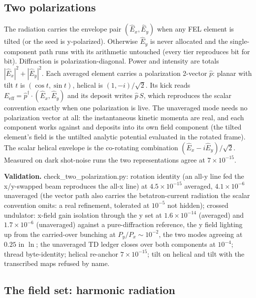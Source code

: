 \documentclass[11pt]{article}
\newenvironment{validation}{\par\small\textbf{Validation.}}{\par}
\begin{document}
\subsection{Two polarizations}\label{sec:vector}

The radiation carries the envelope pair $(\hat E_x, \hat E_y)$ when any FEL element
is tilted (or the seed is y-polarized). Otherwise $\hat E_y$ is never allocated and
the single-component path runs with its arithmetic untouched (every tier reproduces
bit for bit). Diffraction is polarization-diagonal. Power and intensity are totals
$|\hat E_x|^2 + |\hat E_y|^2$. Each averaged element carries a polarization 2-vector
$\hat p$: planar with tilt $t$ is $(\cos t, \sin t)$, helical is $(1, -i)/\sqrt2$.
Its kick reads $E_{\mathrm{eff}} = \hat p^\dagger\!\cdot\!(\hat E_x,\hat E_y)$
and its deposit writes $\hat p\,S$, which reproduces the scalar convention exactly
when one polarization is live. The unaveraged mode needs no polarization vector at
all: the instantaneous kinetic momenta are real, and each component works against and
deposits into its own field component (the tilted element's field is the untilted
analytic potential evaluated in the rotated frame). The scalar helical envelope is
the co-rotating combination $(\hat E_x - i\hat E_y)/\sqrt2$. Measured on dark
shot-noise runs the two representations agree at $7\times10^{-15}$.

\begin{validation}
check\_two\_polarization.py: rotation identity (an all-y line fed the x/y-swapped
beam reproduces the all-x line) at $4.5\times10^{-15}$ averaged, $4.1\times10^{-6}$
unaveraged (the vector path also carries the betatron-current radiation the scalar
convention omits: a real refinement, tolerated at $10^{-5}$ not hidden); crossed
undulator: x-field gain isolation through the y set at $1.6\times10^{-14}$ (averaged)
and $1.7\times10^{-6}$ (unaveraged) against a pure-diffraction reference, the
y field lighting up from the carried-over bunching at $P_y/P_x \sim 10^{-2}$, the
two modes agreeing at $0.25$ in $\ln$; the unaveraged TD ledger closes over both
components at $10^{-4}$; thread byte-identity; helical re-anchor $7\times10^{-15}$;
tilt on helical and tilt with the transcribed maps refused by name.
\end{validation}

\subsection{The field set: harmonic radiation}\label{sec:field-set}
\end{document}

